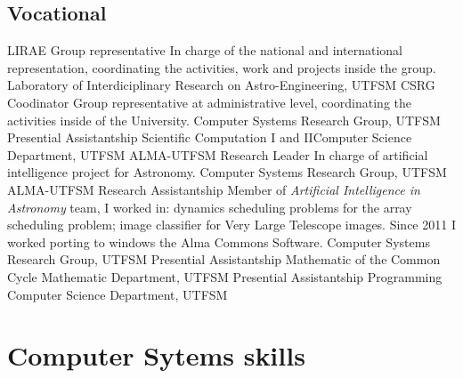 \documentclass[11pt,a4paper]{moderncv}
\begin{document}
\subsection{Vocational}
	{LIRAE Group representative}
	{In charge of the national and international representation, coordinating the activities, work and projects inside the group.}
	{Laboratory of Interdiciplinary Research on Astro-Engineering, UTFSM}
	{}{}
	{CSRG Coodinator}
	{Group representative at administrative level, coordinating the activities inside of the University.}
	{Computer Systems Research Group, UTFSM}
	{}{}
	{Presential Assistantship}
	{Scientific Computation I and II}{Computer Science Department, UTFSM}
	{}{}
	{ALMA-UTFSM Research Leader}
	{In charge of artificial intelligence project for Astronomy.}
	{Computer Systems Research Group, UTFSM}
	{}{}
	{ALMA-UTFSM Research Assistantship}
	{Member of \emph{Artificial Intelligence in Astronomy} team, I worked in:
	dynamics scheduling problems for the array scheduling problem; image classifier for Very Large Telescope
	images. Since 2011 I worked porting to windows the Alma Commons Software.}
	{Computer Systems Research Group, UTFSM}
	{}{}
	{Presential Assistantship}
	{Mathematic of the Common Cycle}
	{Mathematic Department, UTFSM}
	{}{}
	{Presential Assistantship}
	{Programming}
	{Computer Science Department, UTFSM}
	{}{}

\section{Computer Sytems skills}
\end{document}
